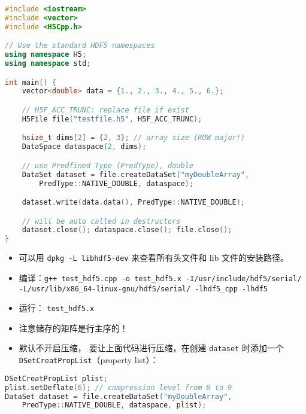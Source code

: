 \begin{lstlisting}[language=cpp,caption=test\_hdf5.cpp]
#include <iostream>
#include <vector>
#include <H5Cpp.h>

// Use the standard HDF5 namespaces
using namespace H5;
using namespace std;

int main() {
	vector<double> data = {1., 2., 3., 4., 5., 6.};

	// H5F_ACC_TRUNC: replace file if exist
	H5File file("testfile.h5", H5F_ACC_TRUNC);

	hsize_t dims[2] = {2, 3}; // array size (ROW major!)
	DataSpace dataspace(2, dims);

	// use Predfined Type (PredType), double
	DataSet dataset = file.createDataSet("myDoubleArray",
		PredType::NATIVE_DOUBLE, dataspace);

	dataset.write(data.data(), PredType::NATIVE_DOUBLE);

	// will be auto called in destructors
	dataset.close(); dataspace.close(); file.close();
}
\end{lstlisting}
\begin{itemize}
\item 可以用 \verb`dpkg -L libhdf5-dev` 来查看所有头文件和 lib 文件的安装路径。
\item 编译：\verb`g++ test_hdf5.cpp -o test_hdf5.x -I/usr/include/hdf5/serial/ -L/usr/lib/x86_64-linux-gnu/hdf5/serial/ -lhdf5_cpp -lhdf5`
\item 运行： \verb`test_hdf5.x`
\item 注意储存的矩阵是行主序的！
\item 默认不开启压缩， 要让上面代码进行压缩，在创建 \verb`dataset` 时添加一个 \verb`DSetCreatPropList`（property list）：
\end{itemize}
\begin{lstlisting}[language=cpp]
DSetCreatPropList plist;
plist.setDeflate(6); // compression level from 0 to 9
DataSet dataset = file.createDataSet("myDoubleArray",
	PredType::NATIVE_DOUBLE, dataspace, plist);
\end{lstlisting}
